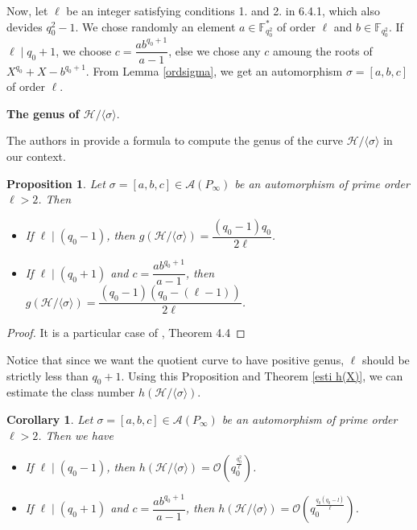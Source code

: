\documentclass[10pt]{article}
\newtheorem{prop1}[thm]{Proposition}
\newtheorem{coro1}[thm]{Corollary}
\newcommand{\s}{\vspace{0.3cm}}
\newcommand{\calA}{\mathcal{A}}
\newcommand{\calH}{\mathcal{H}}
\newcommand{\calO}{\mathcal{O}}
\begin{document}
Now, let $\ell$ be an integer satisfying conditions 1. and 2. in 6.4.1, which also devides $q_0^2-1$. We chose randomly an element $a \in \mathbb{F}_{q_0^2}^*$ of order $\ell$ and $b \in \mathbb{F}_{q_0^2}$. If $\ell \mid q_0+1$, we choose $c=\dfrac{ab^{q_0+1}}{a-1}$, else we chose any $c$ amoung the roots of $X^{q_0}+X-b^{q_0+1}$. From Lemma \ref{ordsigma}, we get an automorphism $\sigma = [a,b,c]$ of order $\ell$.

\s

\textbf{The genus of $\calH/\langle \sigma \rangle$}.

\s

The authors in \cite{Gar} provide a formula to compute the genus of the curve $\calH/\langle \sigma \rangle$ in our context.

\s

\begin{prop1} \label{genus}
Let $\sigma = [a,b,c] \in \calA(P_{\infty})$ be an automorphism of prime order $\ell > 2$. Then 
\begin{itemize}
\item[(i)] If $\ell \mid (q_0-1)$, then $g(\calH/\langle \sigma \rangle) = \dfrac{(q_0-1)q_0}{2\ell}$.
\item[(ii)] If $\ell \mid (q_0+1)$ and $c = \dfrac{ab^{q_0+1}}{a-1}$, then $g(\calH/\langle \sigma \rangle) = \dfrac{(q_0-1)(q_0-(\ell-1))}{2\ell}$.
\end{itemize}
\end{prop1}

\s

\begin{proof}
It is a particular case of \cite{Gar}, Theorem 4.4
\end{proof}

Notice that since we want the quotient curve to have positive genus, $\ell$ should be strictly less than $q_0+1$. Using this Proposition and Theorem \ref{esti h(X)}, we can estimate the class number $h(\calH/\langle \sigma \rangle)$.

\s

\begin{coro1} \label{lastcorollary}
Let $\sigma = [a,b,c] \in \calA(P_{\infty})$ be an automorphism of prime order $\ell > 2$. Then we have 
\begin{itemize}
\item[(i)] If $\ell \mid (q_0-1)$, then $h(\calH/\langle \sigma \rangle) = \calO \left(q_0^{\frac{q_0^2}{\ell}}\right)$.
\item[(ii)] If $\ell \mid (q_0+1)$ and $c=\dfrac{ab^{q_0+1}}{a-1}$, then $h(\calH/\langle \sigma \rangle) = \calO \left(q_0^{\frac{q_0(q_0-l)}{\ell}}\right)$.
\end{itemize}
\end{coro1}
\end{document}
